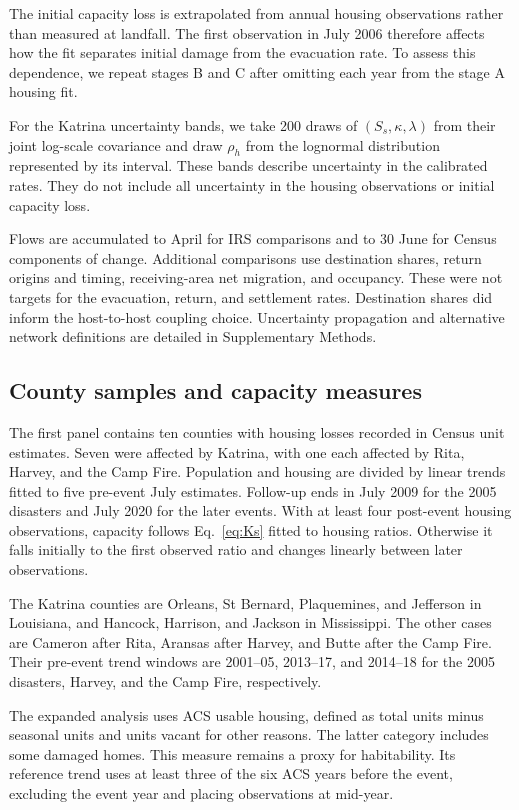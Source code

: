 \documentclass[11pt]{article}
\begin{document}
The initial capacity loss is extrapolated from annual housing observations rather than measured at landfall. The first observation in July 2006 therefore affects how the fit separates initial damage from the evacuation rate. To assess this dependence, we repeat stages B and C after omitting each year from the stage A housing fit.

For the Katrina uncertainty bands, we take 200 draws of $(S_s,\kappa,\lambda)$ from their joint log-scale covariance and draw $\rho_h$ from the lognormal distribution represented by its interval. These bands describe uncertainty in the calibrated rates. They do not include all uncertainty in the housing observations or initial capacity loss.

Flows are accumulated to April for IRS comparisons and to 30 June for Census components of change. Additional comparisons use destination shares, return origins and timing, receiving-area net migration, and occupancy. These were not targets for the evacuation, return, and settlement rates. Destination shares did inform the host-to-host coupling choice. Uncertainty propagation and alternative network definitions are detailed in Supplementary Methods.

\subsection*{County samples and capacity measures}

The first panel contains ten counties with housing losses recorded in Census unit estimates. Seven were affected by Katrina, with one each affected by Rita, Harvey, and the Camp Fire. Population and housing are divided by linear trends fitted to five pre-event July estimates. Follow-up ends in July 2009 for the 2005 disasters and July 2020 for the later events. With at least four post-event housing observations, capacity follows Eq.~\eqref{eq:Ks} fitted to housing ratios. Otherwise it falls initially to the first observed ratio and changes linearly between later observations.

The Katrina counties are Orleans, St Bernard, Plaquemines, and Jefferson in Louisiana, and Hancock, Harrison, and Jackson in Mississippi. The other cases are Cameron after Rita, Aransas after Harvey, and Butte after the Camp Fire. Their pre-event trend windows are 2001--05, 2013--17, and 2014--18 for the 2005 disasters, Harvey, and the Camp Fire, respectively.

The expanded analysis uses ACS usable housing, defined as total units minus seasonal units and units vacant for other reasons. The latter category includes some damaged homes. This measure remains a proxy for habitability. Its reference trend uses at least three of the six ACS years before the event, excluding the event year and placing observations at mid-year.
\end{document}
